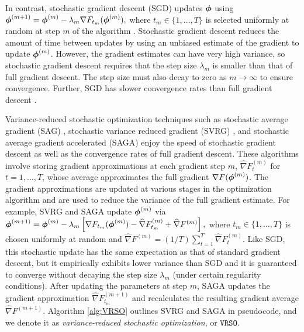 In contrast, stochastic gradient descent (SGD) updates $\boldsymbol{\phi}$ using $\boldsymbol{\phi}^{(m+1)} = \boldsymbol{\phi}^{(m)} - \lambda_m \nabla F_{t_m}(\boldsymbol{\phi}^{(m)}),$ where $t_m \in \{1,\ldots,T\}$ is selected uniformly at random at step $m$ of the algorithm \citep{Robbins:1951}. Stochastic gradient descent reduces the amount of time between updates by using an unbiased estimate of the gradient to update $\boldsymbol{\phi}^{(m)}$. However, the gradient estimates can have very high variance, so stochastic gradient descent requires that the step size $\lambda_m$ is smaller than that of full gradient descent. The step size must also decay to zero as $m \to \infty$ to ensure convergence. Further, SGD has slower convergence rates than full gradient descent \citep{Schmidt:2017}.

Variance-reduced stochastic optimization techniques such as stochastic average gradient (SAG) \citep{Schmidt:2017}, stochastic variance reduced gradient (SVRG) \citep{Johnson:2013}, and stochastic average gradient accelerated (SAGA) \citep{Defazio:2014} enjoy the speed of stochastic gradient descent as well as the convergence rates of full gradient descent. These algorithms involve storing gradient approximations at each gradient step $m$, $\widehat \nabla F_{t}^{(m)}$ for $t = 1,\ldots,T$, whose average approximates the full gradient $\nabla F(\boldsymbol{\phi}^{(m)})$. The gradient approximations are updated at various stages in the optimization algorithm and are used to reduce the variance of the full gradient estimate. For example, SVRG and SAGA update $\boldsymbol{\phi}^{(m)}$ via $\boldsymbol{\phi}^{(m+1)} = \boldsymbol{\phi}^{(m)} - \lambda_m \left[\nabla F_{t_m}(\boldsymbol{\phi}^{(m)}) - \widehat \nabla F_{t_m}^{(m)} + \widehat \nabla F^{(m)} \right],$ where $t_m \in \{1,\ldots,T\}$ is chosen uniformly at random and $\widehat \nabla F^{(m)} = (1/T) \sum_{t=1}^T \widehat \nabla F_{t}^{(m)}$.
%
Like SGD, this stochastic update has the same expectation as that of standard gradient descent, but it empirically exhibits lower variance than SGD and it is guaranteed to converge without decaying the step size $\lambda_m$ (under certain regularity conditions). After updating the parameters at step $m$, SAGA updates the gradient approximation $\widehat \nabla F_{t_m}^{(m+1)}$ and recalculates the resulting gradient average $\widehat \nabla F^{(m+1)}$.
%
Algorithm \ref{alg:VRSO} outlines SVRG and SAGA in pseudocode, and we denote it as \textit{variance-reduced stochastic optimization}, or $\texttt{VRSO}$. 

